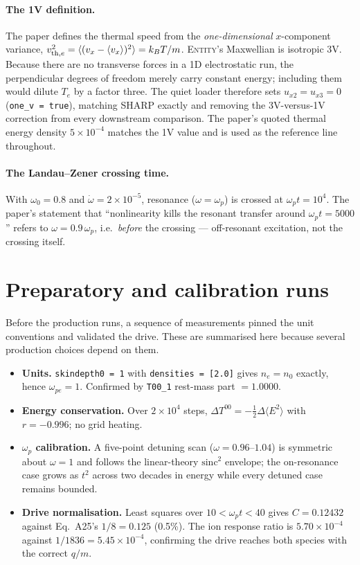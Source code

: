 \documentclass[11pt,a4paper]{article}
\newcommand{\code}[1]{\texttt{\small #1}}
\newcommand{\wpt}{\omega_p t}
\newcommand{\vthsq}{v_{{\rm th},e}^{2}}
\begin{document}
\paragraph{The 1V definition.} The paper defines the thermal speed from the
\emph{one-dimensional} $x$-component variance, $\vthsq = \langle (v_x - \langle v_x
\rangle)^2\rangle = k_BT/m$. \textsc{Entity}'s Maxwellian is isotropic 3V. Because
there are no transverse forces in a 1D electrostatic run, the perpendicular degrees of
freedom merely carry constant energy; including them would dilute $T_e$ by a factor
three. The quiet loader therefore sets $u_{x2}=u_{x3}=0$ (\code{one\_v = true}),
matching \textsc{SHARP} exactly and removing the 3V-versus-1V correction from every
downstream comparison. The paper's quoted thermal energy density $5\times10^{-4}$
matches the 1V value and is used as the reference line throughout.

\paragraph{The Landau--Zener crossing time.} With $\omega_0 = 0.8$ and
$\dot\omega = 2\times10^{-5}$, resonance ($\omega = \omega_p$) is crossed at
$\wpt = 10^4$. The paper's statement that ``nonlinearity kills the resonant transfer
around $\wpt = 5000$'' refers to $\omega = 0.9\,\omega_p$, i.e.\ \emph{before} the
crossing --- off-resonant excitation, not the crossing itself.

\section{Preparatory and calibration runs}

Before the production runs, a sequence of measurements pinned the unit conventions and
validated the drive. These are summarised here because several production choices
depend on them.

\begin{itemize}[nosep]
  \item \textbf{Units.} \code{skindepth0 = 1} with \code{densities = [2.0]} gives
        $n_e = n_0$ exactly, hence $\omega_{pe} = 1$. Confirmed by \code{T00\_1}
        rest-mass part $= 1.0000$.
  \item \textbf{Energy conservation.} Over $2\times10^4$ steps,
        $\Delta T^{00} = -\tfrac12\Delta\langle E^2\rangle$ with $r = -0.996$; no grid
        heating.
  \item \textbf{$\omega_p$ calibration.} A five-point detuning scan
        ($\omega = 0.96$--$1.04$) is symmetric about $\omega = 1$ and follows the
        linear-theory $\mathrm{sinc}^2$ envelope; the on-resonance case grows as $t^2$
        across two decades in energy while every detuned case remains bounded.
  \item \textbf{Drive normalisation.}\label{sec:drivenorm} Least squares over
        $10 < \wpt < 40$ gives $C = 0.12432$ against Eq.~A25's $1/8 = 0.125$
        (0.5\%). The ion response ratio is $5.70\times10^{-4}$ against
        $1/1836 = 5.45\times10^{-4}$, confirming the drive reaches both species with
        the correct $q/m$.
\end{itemize}
\end{document}
